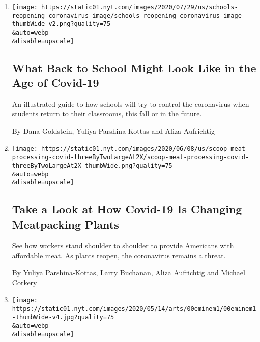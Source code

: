 \begin{enumerate}
\def\labelenumi{\arabic{enumi}.}
\item
  \href{/interactive/2020/07/29/us/schools-reopening-coronavirus.html}{}

  \texttt{[image: https://static01.nyt.com/images/2020/07/29/us/schools-reopening-coronavirus-image/schools-reopening-coronavirus-image-thumbWide-v2.png?quality=75\\\&auto=webp\\\&disable=upscale]}

  \hypertarget{what-back-to-school-might-look-like-in-the-age-of-covid-19}{%
  \subsection{What Back to School Might Look Like in the Age of
  Covid-19}\label{what-back-to-school-might-look-like-in-the-age-of-covid-19}}

  An illustrated guide to how schools will try to control the
  coronavirus when students return to their classrooms, this fall or in
  the future.

  By Dana Goldstein, Yuliya Parshina-Kottas and Aliza Aufrichtig
\item
  \href{/interactive/2020/06/08/us/meat-processing-plants-coronavirus.html}{}

  \texttt{[image: https://static01.nyt.com/images/2020/06/08/us/scoop-meat-processing-covid-threeByTwoLargeAt2X/scoop-meat-processing-covid-threeByTwoLargeAt2X-thumbWide.png?quality=75\\\&auto=webp\\\&disable=upscale]}

  \hypertarget{take-a-look-at-how-covid-19-is-changing-meatpacking-plants}{%
  \subsection{Take a Look at How Covid-19 Is Changing Meatpacking
  Plants}\label{take-a-look-at-how-covid-19-is-changing-meatpacking-plants}}

  See how workers stand shoulder to shoulder to provide Americans with
  affordable meat. As plants reopen, the coronavirus remains a threat.

  By Yuliya Parshina-Kottas, Larry Buchanan, Aliza Aufrichtig and
  Michael Corkery
\item
  \href{/interactive/2020/05/18/arts/music/eminem-marshall-mathers-lp.html}{}

  \texttt{[image: https://static01.nyt.com/images/2020/05/14/arts/00eminem1/00eminem1-thumbWide-v4.jpg?quality=75\\\&auto=webp\\\&disable=upscale]}


\end{enumerate}

